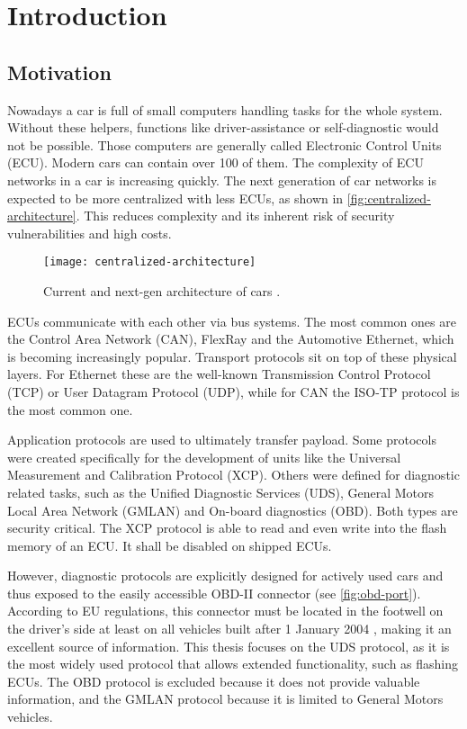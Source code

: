 \chapter{Introduction}
\label{sec:introduction}

\section{Motivation}
Nowadays a car is full of small computers handling tasks for the whole system. Without these helpers, functions like driver-assistance or self-diagnostic would not be possible. Those computers are generally called Electronic Control Units (ECU). Modern cars can contain over 100 of them. The complexity of ECU networks in a car is increasing quickly. The next generation of car networks is expected to be more centralized with less ECUs, as shown in \autoref{fig:centralized-architecture}. This reduces complexity and its inherent risk of security vulnerabilities and high costs.

\begin{figure}[htb]
    \centering
    \texttt{[image: centralized-architecture]}
    \caption{Current and next-gen architecture of cars \cite{car-architecture}.}
    \label{fig:centralized-architecture}
\end{figure}

ECUs communicate with each other via bus systems. The most common ones are the Control Area Network (CAN), FlexRay and the Automotive Ethernet, which is becoming increasingly popular. Transport protocols sit on top of these physical layers. For Ethernet these are the well-known Transmission Control Protocol (TCP) or User Datagram Protocol (UDP), while for CAN the ISO-TP protocol is the most common one.

Application protocols are used to ultimately transfer payload. Some protocols were created specifically for the development of units like the Universal Measurement and Calibration Protocol (XCP). Others were defined for diagnostic related tasks, such as the Unified Diagnostic Services (UDS), General Motors Local Area Network (GMLAN) and On-board diagnostics (OBD). Both types are security critical. The XCP protocol is able to read and even write into the flash memory of an ECU. It shall be disabled on shipped ECUs.

However, diagnostic protocols are explicitly designed for actively used cars and thus exposed to the easily accessible OBD-II connector (see \autoref{fig:obd-port}). According to EU regulations, this connector must be located in the footwell on the driver's side at least on all vehicles built after 1 January 2004 \cite{eu-regulation, iso15031}, making it an excellent source of information. This thesis focuses on the UDS protocol, as it is the most widely used protocol that allows extended functionality, such as flashing ECUs. The OBD protocol is excluded because it does not provide valuable information, and the GMLAN protocol because it is limited to General Motors vehicles.

